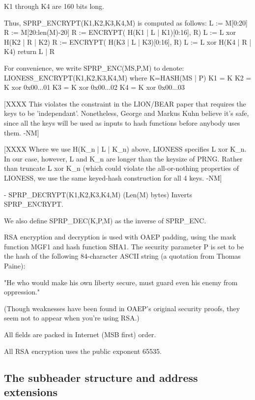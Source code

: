   K1 through K4 are 160 bits long.

  Thus, SPRP_ENCRYPT(K1,K2,K3,K4,M) is computed as follows:
            L := M[0:20]
            R := M[20:len(M)-20]
            R := ENCRYPT( H(K1 | L | K1)[0:16], R)
            L := L xor H(K2 | R | K2)
            R := ENCRYPT( H(K3 | L | K3)[0:16], R)
            L := L xor H(K4 | R | K4) 
            return L | R

  For convenience, we write SPRP_ENC(MS,P,M) to denote:
       LIONESS_ENCRYPT(K1,K2,K3,K4,M)
       where K=HASH(MS | P)
             K1 = K
             K2 = K xor 0x00...01
             K3 = K xor 0x00...02
             K4 = K xor 0x00...03

  [XXXX This violates the constraint in the LION/BEAR paper that
        requires the keys to be 'independant'.  Nonetheless, George
	and Markus Kuhn believe it's safe, since all the keys
        will be used as inputs to hash functions before anybody
        uses them. -NM]

  [XXXX Where we use H(K_n | L | K_n) above, LIONESS specifies 
        L xor K_n.  In our case, however, L and K_n are longer than
        the keysize of PRNG.  Rather than truncate L xor K_n (which
        could violate the all-or-nothing properties of LIONESS,
        we use the same keyed-hash construction for all 4 keys. -NM]

- SPRP_DECRYPT(K1,K2,K3,K4,M) (Len(M) bytes) Inverts SPRP_ENCRYPT.

  We also define SPRP_DEC(K,P,M) as the inverse of SPRP_ENC.
    
RSA encryption and decryption is used with OAEP padding, using the 
mask function MGF1 and hash function SHA1.  The security
parameter P is set to be the hash of the following 84-character ASCII
string (a quotation from Thomas Paine): 

     "He who would make his own liberty secure, must guard even his
      enemy from oppression." 

(Though weaknesses have been found in OAEP's original security proofs,
they seem not to appear when you're using RSA.)

All fields are packed in Internet (MSB first) order.

All RSA encryption uses the public exponent 65535.

\subsection{The subheader structure and address extensions}

